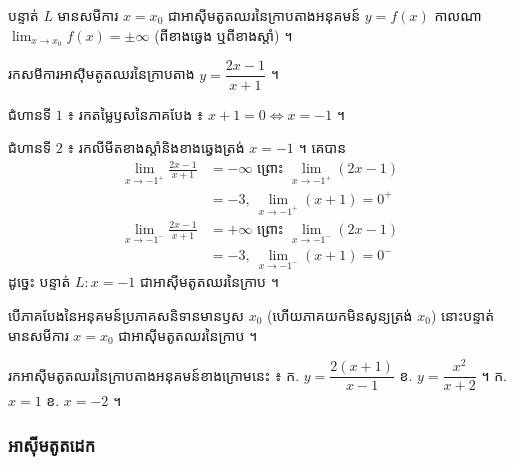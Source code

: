 \begin{center}
\end{center}

\begin{formulaBox}[ជាទូទៅ]
បន្ទាត់ $L$ មានសមីការ $x = x_0$ ជាអាស៊ីមតូតឈរនៃក្រាបតាងអនុគមន៍ $y = f(x)$ កាលណា $\displaystyle\lim_{x \to x_0} f(x) = \pm\infty$ (ពីខាងឆ្វេង ឬពីខាងស្ដាំ) ។
\end{formulaBox}

\begin{example}[លំហាត់គំរូ]
រកសមីការអាស៊ីមតូតឈរនៃក្រាបតាង $y = \dfrac{2x - 1}{x + 1}$ ។
\end{example}
\ans
ជំហានទី $1$ ៖ រកតម្លៃឫសនៃភាគបែង ៖ $x + 1 = 0 \Leftrightarrow x = -1$ ។

ជំហានទី $2$ ៖ រកលីមីតខាងស្ដាំនិងខាងឆ្វេងត្រង់ $x = -1$ ។ គេបាន
\[
\begin{aligned}
\lim_{x \to -1^+}\frac{2x - 1}{x + 1} &= -\infty \text{ ព្រោះ } \lim_{x \to -1^+}(2x - 1)\\
&= -3, \ \lim_{x \to -1^+}(x + 1) = 0^+
\end{aligned}
\]
\[
\begin{aligned}
\lim_{x \to -1^-}\frac{2x - 1}{x + 1} &= +\infty \text{ ព្រោះ } \lim_{x \to -1^-}(2x - 1)\\
&= -3, \ \lim_{x \to -1^-}(x + 1) = 0^-
\end{aligned}
\]
ដូច្នេះ បន្ទាត់ $L : x = -1$ ជាអាស៊ីមតូតឈរនៃក្រាប ។

\begin{note}[សម្គាល់]
បើភាគបែងនៃអនុគមន៍ប្រភាគសនិទានមានឫស $x_0$ (ហើយភាគយកមិនសូន្យត្រង់ $x_0$) នោះបន្ទាត់មានសមីការ $x = x_0$ ជាអាស៊ីមតូតឈរនៃក្រាប ។
\end{note}

\begin{pro}
រកអាស៊ីមតូតឈរនៃក្រាបតាងអនុគមន៍ខាងក្រោមនេះ ៖ \quad ក. $y = \dfrac{2(x + 1)}{x - 1}$ \quad ខ. $y = \dfrac{x^2}{x + 2}$ ។
\ans
ក. $x = 1$ \quad ខ. $x = -2$ ។
\end{pro}

\subsubsection{អាស៊ីមតូតដេក}

